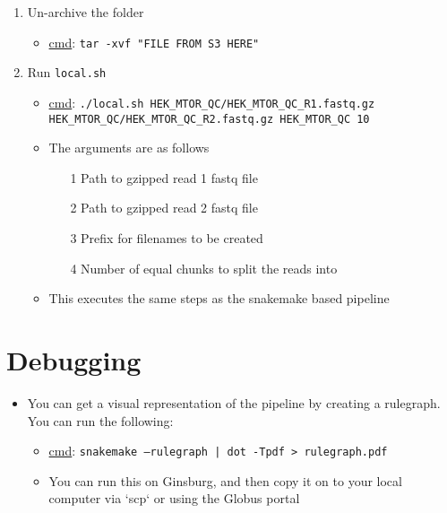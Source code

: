 \documentclass{article}
\begin{document}
\begin{enumerate}
        \item Un-archive the folder
        \begin{itemize}
            \item \underline{cmd}: \texttt{tar -xvf "FILE FROM S3 HERE"}
        \end{itemize}

        \item Run \texttt{local.sh}
        \begin{itemize}
            \item \underline{cmd}: \texttt{./local.sh HEK\_MTOR\_QC/HEK\_MTOR\_QC\_R1.fastq.gz HEK\_MTOR\_QC/HEK\_MTOR\_QC\_R2.fastq.gz HEK\_MTOR\_QC 10}
            \item The arguments are as follows
                \begin{enumerate}
                    \item[1] Path to gzipped read 1 fastq file
                    \item[2] Path to gzipped read 2 fastq file
                    \item[3] Prefix for filenames to be created
                    \item[4] Number of equal chunks to split the reads into
                \end{enumerate}
            \item This executes the same steps as the snakemake based pipeline
        \end{itemize}
    \end{enumerate}

    \noindent\makebox[\linewidth]{\rule{\paperwidth}{0.4pt}}

    \section{Debugging}

    \begin{itemize}
        \item You can get a visual representation of the pipeline by creating a rulegraph. You can run the following:
            \begin{itemize}
                \item \underline{cmd}: \texttt{snakemake --rulegraph | dot -Tpdf > rulegraph.pdf}
                \item You can run this on Ginsburg, and then copy it on to your local computer via `scp` or using the Globus portal
            \end{itemize}
    \end{itemize}
\end{document}
